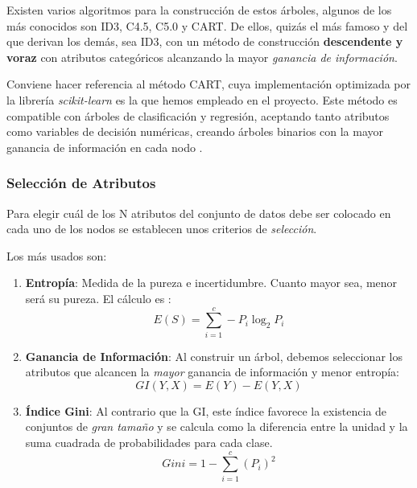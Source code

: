 Existen varios algoritmos para la construcción de estos árboles, algunos de los más conocidos son ID3, C4.5, C5.0 y CART.  
De ellos, quizás el más famoso y del que derivan los demás, sea ID3, con un método de construcción \textbf{descendente y voraz} con atributos categóricos alcanzando la mayor \textit{ganancia de información}.

Conviene hacer referencia al método CART, cuya implementación optimizada por la librería \textit{scikit-learn} es la que hemos empleado en el proyecto. Este método es compatible con árboles de clasificación y regresión, aceptando tanto atributos como variables de decisión numéricas, creando árboles binarios con la mayor ganancia de información en cada nodo \cite{Belyadi2021SupervisedLearning}.

\subsubsection{Selección de Atributos}

Para elegir cuál de los N atributos del conjunto de datos debe ser colocado en cada uno de los nodos se establecen unos criterios de \textit{selección}.

Los más usados son:

\begin{enumerate}
    \item \textbf{Entropía}: Medida de la pureza e incertidumbre. Cuanto mayor sea, menor será su pureza. El cálculo es \cite{Belyadi2021SupervisedLearning}: \begin{equation}
        E(S) = \sum_{i=1}^{c}-P_{i}\log_{2}P_{i} 
    \end{equation}
    \item \textbf{Ganancia de Información}: Al construir un árbol, debemos seleccionar los atributos que alcancen la \textit{mayor} ganancia de información y menor entropía: \begin{equation}
        GI(Y,X) = E(Y) - E(Y,X)
    \end{equation}
    \item \textbf{Índice Gini}: Al contrario que la GI, este índice favorece la existencia de conjuntos de \textit{gran tamaño} y se calcula como la diferencia entre la unidad y la suma cuadrada de probabilidades para cada clase. \begin{equation}
        Gini = 1 - \sum_{i=1}^{c}(P_{i})^2
    \end{equation}
\end{enumerate}

